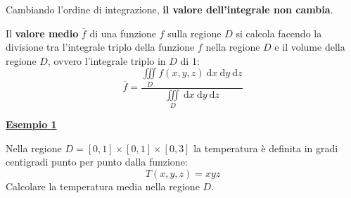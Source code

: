 \documentclass[a4paper]{article}
\newcommand{\definition}[1]{\textcolor{Red3}{\textbf{#1}}}
\newcommand{\example}[1]{\textcolor{Green4}{\textbf{#1}}}
\begin{document}
	\noindent
	Cambiando l'ordine di integrazione, \textbf{il valore dell'integrale non cambia}.
	
	\begin{boxdef}
		Il \definition{valore medio} $\overline{f}$ di una funzione $f$ sulla regione $D$ si calcola facendo la divisione tra l'integrale triplo della funzione $f$ nella regione $D$ e il volume della regione $D$, ovvero l'integrale triplo in $D$ di $1$:
		\begin{equation}
			\overline{f} = \dfrac{
				\displaystyle\iiint\limits_{D} f\left(x,y,z\right) \:\mathrm{d}x\:\mathrm{d}y\:\mathrm{d}z
			}{
				\displaystyle\iiint\limits_{D} \:\mathrm{d}x\:\mathrm{d}y\:\mathrm{d}z
			}
		\end{equation}
	\end{boxdef}\newpage

	\begin{flushleft}
		\example{\underline{Esempio 1}}
	\end{flushleft}
	Nella regione $D = \left[0,1\right] \times \left[0,1\right] \times \left[0,3\right]$ la temperatura è definita in gradi centigradi punto per punto dalla funzione:
	\begin{equation*}
		T\left(x,y,z\right) = xyz
	\end{equation*}
	Calcolare la temperatura media nella regione $D$.\newline
\end{document}
